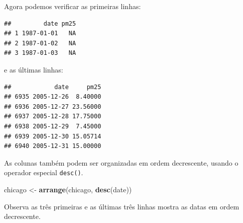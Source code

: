 \documentclass[]{book}
\newenvironment{Shaded}{\begin{snugshade}}{\end{snugshade}}
\newcommand{\DecValTok}[1]{\textcolor[rgb]{0.00,0.00,0.81}{#1}}
\newcommand{\KeywordTok}[1]{\textcolor[rgb]{0.13,0.29,0.53}{\textbf{#1}}}
\newcommand{\NormalTok}[1]{#1}
\newcommand{\OperatorTok}[1]{\textcolor[rgb]{0.81,0.36,0.00}{\textbf{#1}}}
\newcommand{\StringTok}[1]{\textcolor[rgb]{0.31,0.60,0.02}{#1}}
\begin{document}
Agora podemos verificar as primeiras linhas:

\begin{Shaded}
\end{Shaded}

\begin{verbatim}
##         date pm25
## 1 1987-01-01   NA
## 2 1987-01-02   NA
## 3 1987-01-03   NA
\end{verbatim}

e as últimas linhas:

\begin{Shaded}
\end{Shaded}

\begin{verbatim}
##            date     pm25
## 6935 2005-12-26  8.40000
## 6936 2005-12-27 23.56000
## 6937 2005-12-28 17.75000
## 6938 2005-12-29  7.45000
## 6939 2005-12-30 15.05714
## 6940 2005-12-31 15.00000
\end{verbatim}

As colunas também podem ser organizadas em ordem decrescente, usando o operador especial \texttt{desc()}.

\begin{Shaded}
\begin{Highlighting}[]
\NormalTok{chicago <-}\StringTok{ }\KeywordTok{arrange}\NormalTok{(chicago, }\KeywordTok{desc}\NormalTok{(date))}
\end{Highlighting}
\end{Shaded}

Observa as três primeiras e as últimas três linhas mostra as datas em ordem decrescente.

\begin{Shaded}
\end{Shaded}
\end{document}
